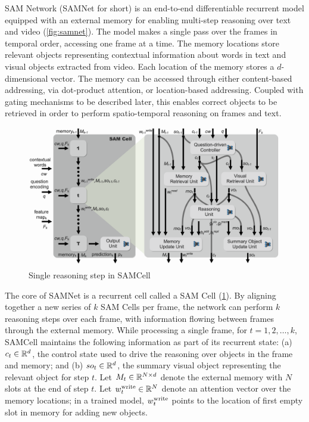 SAM Network (SAMNet for short) is an end-to-end differentiable recurrent model equipped with an external memory for enabling multi-step reasoning over text and video (\cref{fig:samnet}).
The model makes a single pass over the frames in temporal order, accessing one frame at a time.
The memory locations store relevant objects representing contextual information about words in text and visual objects extracted from video. 
Each location of the memory stores a $d$-dimensional vector. %
The memory  can be accessed through either content-based addressing, via dot-product attention, or location-based addressing. 
Coupled with gating mechanisms to be described later, this enables correct objects to be retrieved 
in order to perform spatio-temporal reasoning on frames and text. 

\begin{figure}[hbtp]
	\centering
	\includegraphics[width=\textwidth]{../img/architecture/samcell_reasoning}
	\caption{Single reasoning step in SAMCell}
	\label{fig:samcell}
\end{figure}	

The core of SAMNet is a recurrent cell called a SAM Cell (\cref{fig:samcell}). 
By aligning together a new series of $k$ SAM Cells per frame, the network can perform $k$ 
reasoning steps over each frame, with information flowing between frames through the external memory. 
While processing a single frame, for $t=1,2, \dots, k$, SAMCell maintains the following information as part of its recurrent state:
(a) $c_t \in \mathbb{R}^d$, the control state used to drive the reasoning over objects in the frame and memory; and
(b) $so_t  \in \mathbb{R}^d$, the summary visual object representing the relevant object for step $t$.
Let $M_t \in  \mathbb{R}^{N \times d}$ denote the external memory with $N$ slots at the end of step $t$.
Let $w^{\mathrm{write}}_t \in  \mathbb{R}^N$ denote an attention vector over the memory locations;
in a trained model, $w^{\mathrm{write}}_t$ points to the location of first empty slot in memory for adding new objects.   

